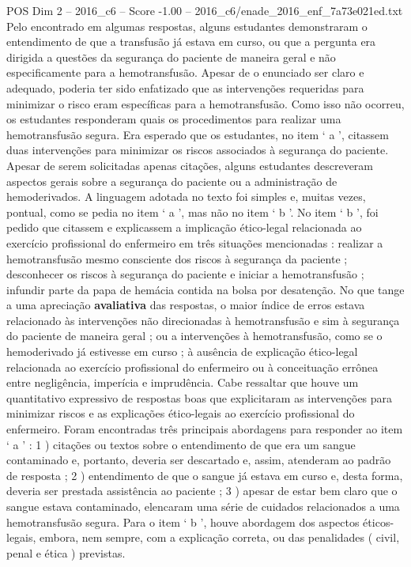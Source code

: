 \begin{textsample}{POS Dim 2 – 2016\_c6 – Score -1.00 – 2016\_c6/enade\_2016\_enf\_7a73e021ed.txt}
Pelo encontrado em algumas respostas, alguns estudantes demonstraram o entendimento de que a transfusão já estava em curso, ou que a pergunta era dirigida a questões da segurança do paciente de maneira geral e não especificamente para a hemotransfusão.
Apesar de o enunciado ser claro e adequado, poderia ter sido enfatizado que as intervenções requeridas para minimizar o risco eram específicas para a hemotransfusão.
Como isso não ocorreu, os estudantes responderam quais os procedimentos para realizar uma hemotransfusão segura.
Era esperado que os estudantes, no item ‘ a ’, citassem duas intervenções para minimizar os riscos associados à segurança do paciente.
Apesar de serem solicitadas apenas citações, alguns estudantes descreveram aspectos gerais sobre a segurança do paciente ou a administração de hemoderivados.
A linguagem adotada no texto foi simples e, muitas vezes, pontual, como se pedia no item ‘ a ’, mas não no item ‘ b ’.
No item ‘ b ’, foi pedido que citassem e explicassem a implicação ético-legal relacionada ao exercício profissional do enfermeiro em três situações mencionadas : realizar a hemotransfusão mesmo consciente dos riscos à segurança da paciente ; desconhecer os riscos à segurança do paciente e iniciar a hemotransfusão ; infundir parte da papa de hemácia contida na bolsa por desatenção.
No que tange a uma apreciação \textbf{avaliativa} das respostas, o maior índice de erros estava relacionado às intervenções não direcionadas à hemotransfusão e sim à segurança do paciente de maneira geral ; ou a intervenções à hemotransfusão, como se o hemoderivado já estivesse em curso ; à ausência de explicação ético-legal relacionada ao exercício profissional do enfermeiro ou à conceituação errônea entre negligência, imperícia e imprudência.
Cabe ressaltar que houve um quantitativo expressivo de respostas boas que explicitaram as intervenções para minimizar riscos e as explicações ético-legais ao exercício profissional do enfermeiro.
Foram encontradas três principais abordagens para responder ao item ‘ a ’ : 1 ) citações ou textos sobre o entendimento de que era um sangue contaminado e, portanto, deveria ser descartado e, assim, atenderam ao padrão de resposta ; 2 ) entendimento de que o sangue já estava em curso e, desta forma, deveria ser prestada assistência ao paciente ; 3 ) apesar de estar bem claro que o sangue estava contaminado, elencaram uma série de cuidados relacionados a uma hemotransfusão segura.
Para o item ‘ b ’, houve abordagem dos aspectos éticos-legais, embora, nem sempre, com a explicação correta, ou das penalidades ( civil, penal e ética ) previstas.

\end{textsample}
